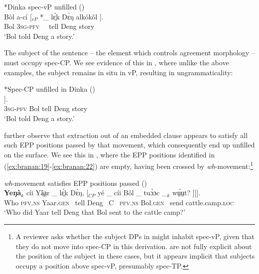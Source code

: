 \documentclass[output=paper,colorlinks,citecolor=brown]{langscibook}
\begin{document}
\ea%
    \label{ex:branan:21}
    *Dinka spec-vP unfilled \hfill{(\citealt[ex. 33c]{VanUrkRichards2015})}\\
    \gll    B\`{o}l a-c\'{i} [$_{vP}$ *\_ lɛ̤́k  D\`{ɛ}ŋ alk\'{o}k\^{o}l ].  \\
            Bol \textsc{3sg-pfv} \, \,  tell Deng story \\
    \glt    `Bol told Deng a story.'
\z

The subject of the sentence -- the element which controls agreement morphology -- must occupy spec-CP. We see evidence of this in , where unlike the above examples, the subject remains in situ in vP, resulting in ungrammaticality:

\ea%
    \label{ex:branan:22}
    *Spec-CP unfilled in Dinka \hfill{(\citealt[ex. 33d]{VanUrkRichards2015})}\\
    \gll    *[$_{CP}$ \_  a-c\'{i}i  [$_{vP}$ B\`{o}l   lɛ̤́k  D\`{ɛ}ŋ alk\'{o}k\^{o}l ] ]. \\
            {} {} \textsc{3sg-pfv} {}  Bol tell Deng story \\
    \glt    `Bol told Deng a story.'
\z

\citeauthor{VanUrkRichards2015} further observe that extraction out of an embedded clause appears to satisfy all such EPP positions passed by that movement, which consequently end up unfilled on the surface. We see this in , where the EPP positions identified in (\ref{ex:branan:19}-\ref{ex:branan:22}) are empty, having been crossed by \textit{wh}-movement:\footnote{A reviewer asks whether the subject DPs in  might inhabit spec-vP, given that they do not move into spec-CP in this derivation. \citeauthor{VanUrkRichards2015} are not fully explicit about the position of the subject in these cases, but it appears implicit that subjects occupy a position above spec-vP, presumably spec-TP.}

\ea%
    \label{ex:branan:23}
    \textit{wh}-movement satisfies EPP positions passed
    \hfill{(\citealt[ex. 37]{VanUrkRichards2015})}\\
    \gll    \textbf{Yeŋ\`{a}}$_{k}$ c\'{i}i  Yâ̤a̤r \_ lɛ̤́k  D\`{ɛ}ŋ, [$_{CP}$ y\'{e} \_  c\'{i}i  B\^{o}l \_ tu\`{ɔ}ɔc \_$_{k}$ wṳ́ṳt?  ]]]. \\
            Who \textsc{pfv.ns}   Yaar.\textsc{gen} \,  tell Deng \, C \, \textsc{pfv.ns}  Bol.\textsc{gen} \, send {} cattle.camp.\textsc{loc}  \\
    \glt    `Who did Yaar tell Deng that Bol sent to the cattle camp?'
\z
\end{document}
